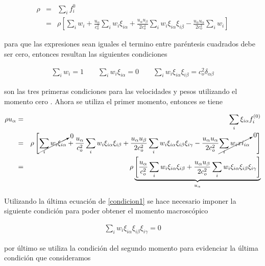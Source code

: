 \begin{eqnarray}
\rho &=& \sum_{i}f_{i}^{0}\nonumber\\
&=&\rho\left[\sum_{i}w_{i}+\frac{u_{\alpha}}{c_{o}^{2}}\sum_{i}w_{i}\xi_{i\alpha}+\frac{u_{\alpha}u_{\beta}}{2c_{o}^{4}}\sum_{i}w_{i}\xi_{i\alpha}\xi_{i\beta}-\frac{u_{\alpha}u_{\alpha}}{2c_{o}^{2}}\sum_{i}w_{i}\right]
\end{eqnarray}


\noindent para que las expresiones sean iguales el termino entre paréntesis cuadrados debe ser cero, entonces resultan las siguientes condiciones 

\begin{eqnarray}
\label{condicion1}
\sum_{i}w_{i}=1\qquad \sum_{i}w_{i}\xi_{i\alpha} = 0 \qquad \sum_{i}w_{i}\xi_{i\alpha}\xi_{i\beta}=c_{o}^{2}\delta_{\alpha\beta}
\end{eqnarray}

\noindent son las tres primeras condiciones para las velocidades y pesos utilizando el momento cero . Ahora se utiliza el primer momento, entonces se tiene

\begin{eqnarray}
\rho u_{\alpha} &=& \sum_{i}\xi_{i\alpha}f_{i}^{(0)}\nonumber\\
&=&\rho\left[\cancelto{0}{\sum_{i}w_{i}\xi_{i\alpha}}+\frac{u_{\alpha}}{c_{o}^{2}}\sum_{i}w_{i}\xi_{i\alpha}\xi_{i\beta}+\frac{u_{\alpha}u_{\beta}}{2c_{o}^{2}}\sum_{i}w_{i}\xi_{i\alpha}\xi_{i\beta}\xi_{i\gamma}-\frac{u_{\alpha}u_{\alpha}}{2c_{o}^{2}}\cancelto{0}{\sum_{i}w_{i}xi_{i\alpha}}\quad\right]\nonumber\\
&=&\rho\underbrace{\left[\frac{u_{\alpha}}{c_{o}^{2}}\sum_{i}w_{i}\xi_{i\alpha}\xi_{i\beta}+\frac{u_{\alpha}u_{\beta}}{2c_{o}^{2}}\sum_{i}w_{i}\xi_{i\alpha}\xi_{i\beta}\xi_{i\gamma}\right]}_{u_{\alpha}}
\end{eqnarray}

Utilizando la última ecuación de \eqref{condicion1} se hace necesario imponer la siguiente condición para poder obtener el momento macroscópico

\begin{eqnarray}
\label{condicion2}
\sum_{i}w_{i}\xi_{i\alpha}\xi_{i\beta}\xi_{i\gamma} = 0 
\end{eqnarray}

\noindent por último se utiliza la condición del segundo momento para evidenciar la última condición que consideramos 

